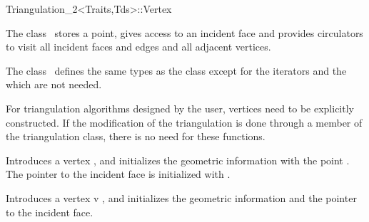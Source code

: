 

\begin{ccRefClass}{Triangulation_2<Traits,Tds>::Vertex}  %


\ccDefinition
  
The class \ccRefName\ stores a point, gives access to an incident face
and provides circulators to visit all incident faces and edges
and all adjacent vertices.





\ccTypes
The class \ccRefName\ defines the same types 
as the class  
except for the iterators and the 
 which are not needed.

\begin{ccAdvanced}
\ccCreation

For triangulation algorithms designed by the user, vertices need to be
explicitly constructed.  If the modification of the triangulation is
done through a member of the triangulation class, there is no need for these
functions.


{Introduces a vertex \ccVar, and initializes the geometric information
with the point .
The pointer to the incident face is initialized with .}

{Introduces a vertex v \ccVar, and initializes the geometric information and 
the pointer to the incident face.}
\end{ccAdvanced}


\end{ccRefClass}
